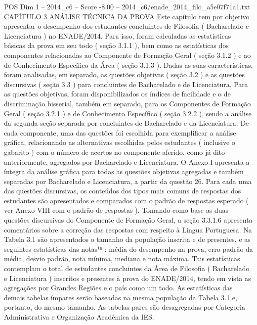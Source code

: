 \begin{textsample}{POS Dim 1 – 2014\_c6 – Score -8.00 – 2014\_c6/enade\_2014\_filo\_a5e07f71a1.txt}  \label{ex:f1_pos_429}
CAPÍTULO 3 ANÁLISE TÉCNICA DA PROVA Este capítulo tem por objetivo apresentar o desempenho dos estudantes concluintes de Filosofia ( Bacharelado e Licenciatura ) no ENADE/2014.
Para isso, foram calculadas as estatísticas básicas da prova em seu todo ( seção 3.1.1 ), bem como as estatísticas dos componentes relacionadas ao Componente de Formação Geral ( seção 3.1.2 ) e ao de Conhecimento Específico da Área ( seção 3.1.3 ).
Dadas as suas características, foram analisadas, em separado, as questões objetivas ( seção 3.2 ) e as questões discursivas ( seção 3.3 ) para concluintes de Bacharelado e de Licenciatura.
Para as questões objetivas, foram disponibilizados os índices de facilidade e o de discriminação bisserial, também em separado, para os Componentes de Formação Geral ( seção 3.2.1 ) e de Conhecimento Específico ( seção 3.2.2 ), sendo a análise da segunda seção separada por concluintes de Bacharelado e da Licenciatura.
De cada componente, uma das questões foi escolhida para exemplificar a análise gráfica, relacionando as alternativas escolhidas pelos estudantes ( inclusive o gabarito ) com o número de acertos no componente aferido, como já dito anteriormente, agregados por Bacharelado e Licenciatura.
O Anexo I apresenta a íntegra da análise gráfica para todas as questões objetivas agregadas e também separadas por Bacharelado e Licenciatura, a partir da questão 26.
Para cada uma das questões discursivas, os conteúdos dos tipos mais comuns de respostas dos estudantes são apresentados e comparados com o padrão de respostas esperado ( ver Anexo VIII com o padrão de respostas ).
Tomando como base as duas questões discursivas do Componente de Formação Geral, a seção 3.3.1.6 apresenta comentários sobre a correção das respostas com respeito à Língua Portuguesa.
Na Tabela 3.1 são apresentados o tamanho da população inscrita e de presentes, e as seguintes estatísticas das notas¹⁹ : média do desempenho na prova, erro padrão da média, desvio padrão, nota mínima, mediana e nota máxima.
Tais estatísticas contemplam o total de estudantes concluintes da Área de Filosofia ( Bacharelado e Licenciatura ) inscritos e presentes à prova do ENADE/2014, tendo em vista as agregações por Grandes Regiões e o país como um todo.
As estatísticas das demais tabelas ímpares serão baseadas na mesma população da Tabela 3.1 e, portanto, do mesmo tamanho.
As tabelas pares são desagregadas por Categoria Administrativa e Organização Acadêmica da IES.

\end{textsample}
